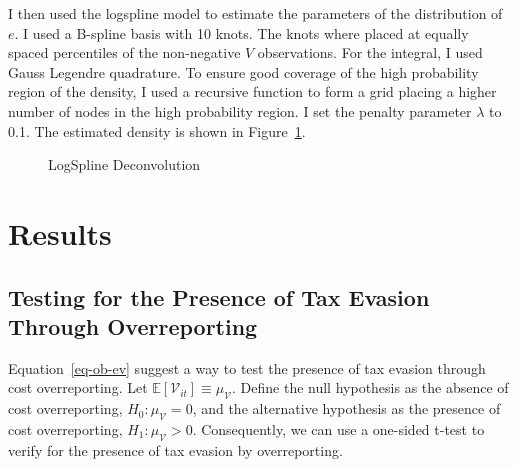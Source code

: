 \documentclass[
  12pt]{article}
\theoremstyle{definition}
\theoremstyle{remark}
\begin{document}
I then used the logspline model to estimate the parameters of the
distribution of \(e\). I used a B-spline basis with 10 knots. The knots
where placed at equally spaced percentiles of the non-negative \(V\)
observations. For the integral, I used Gauss Legendre quadrature. To
ensure good coverage of the high probability region of the density, I
used a recursive function to form a grid placing a higher number of
nodes in the high probability region. I set the penalty parameter
\(\lambda\) to 0.1. The estimated density is shown in
Figure~\ref{fig-simulated-deconv}.

\begin{figure}


\caption{\label{fig-simulated-deconv}LogSpline Deconvolution}

\end{figure}%

\section{Results}\label{results}

\subsection{Testing for the Presence of Tax Evasion Through
Overreporting}\label{sec-tax-ev-test}

Equation~\ref{eq-ob-ev} suggest a way to test the presence of tax
evasion through cost overreporting. Let
\(\mathbb{E}[\mathcal{V}_{it}]\equiv \mu_{\mathcal{V}}\). Define the
null hypothesis as the absence of cost overreporting,
\(H_0: \mu_{\mathcal{V}}=0\), and the alternative hypothesis as the
presence of cost overreporting, \(H_1: \mu_{\mathcal{V}}>0\).
Consequently, we can use a one-sided t-test to verify for the presence
of tax evasion by overreporting.
\end{document}
